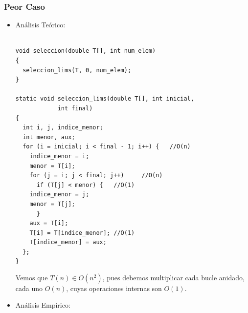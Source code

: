 \documentclass[a4paper,12pt,twoside]{article} %
\begin{document}
	\subsubsection{Peor Caso}
	\begin{itemize}
	
		\item Análisis Teórico:
		
		\lstset{language=C++}
	\begin{lstlisting}
	
void seleccion(double T[], int num_elem)
{
  seleccion_lims(T, 0, num_elem);
}

static void seleccion_lims(double T[], int inicial, 
			int final)
{
  int i, j, indice_menor;
  int menor, aux;
  for (i = inicial; i < final - 1; i++) {	//O(n)
    indice_menor = i;
    menor = T[i];
    for (j = i; j < final; j++)		//O(n)
      if (T[j] < menor) {	//O(1)
	indice_menor = j;
	menor = T[j];
      }
    aux = T[i];
    T[i] = T[indice_menor];	//O(1)
    T[indice_menor] = aux;
  };
}

	\end{lstlisting}
	
	Vemos que $T(n) \in O(n^2)$, pues debemos multiplicar cada bucle anidado, cada uno $O(n)$, cuyas operaciones internas son $O(1)$.
	
\newpage

		\item Análisis Empírico:
		

\end{itemize}
\end{document}
